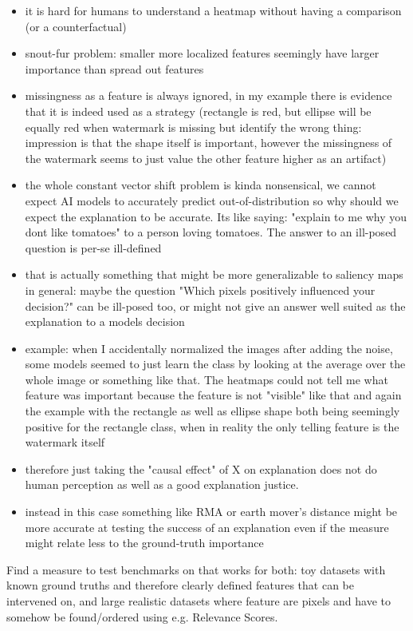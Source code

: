 {\begin{itemize}
    \item it is hard for humans to understand a heatmap without having a comparison (or a counterfactual)
    \item snout-fur problem: smaller more localized features seemingly have larger importance than spread out features
    \item missingness as a feature is always ignored, in my example there is evidence that it is indeed used as a strategy (rectangle is red, but ellipse will be equally red when watermark is missing but identify the wrong thing: impression is that the shape itself is important, however the missingness of the watermark seems to just value the other feature higher as an artifact)
    \item the whole constant vector shift problem is kinda nonsensical, we cannot expect AI models to accurately predict out-of-distribution so why should we expect the explanation to be accurate. Its like saying: "explain to me why you dont like tomatoes" to a person loving tomatoes. The answer to an ill-posed question is per-se ill-defined
    \item that is actually something that might be more generalizable to saliency maps in general: maybe the question "Which pixels positively influenced your decision?" can be ill-posed too, or might not give an answer well suited as the explanation to a models decision
    \item example: when I accidentally normalized the images after adding the noise, some models seemed to just learn the class by looking at the average over the whole image or something like that. The heatmaps could not tell me what feature was important because the feature is not "visible" like that
    and again the example with the rectangle as well as ellipse shape both being seemingly positive for the rectangle class, when in reality the only telling feature is the watermark itself
    \item therefore just taking the "causal effect" of X on explanation does not do human perception as well as a good explanation justice.
    \item instead in this case something like RMA or earth mover's distance might be more accurate at testing the success of an explanation even if the measure might relate less to the ground-truth importance
\end{itemize}

Find a measure to test benchmarks on that works for both: toy datasets with known ground truths and therefore clearly defined features that can be intervened on, and large realistic datasets where feature are pixels and have to somehow be found/ordered using e.g. Relevance Scores.

}
